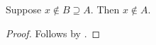 

\begin{composition}\label{independent_negative_right}
    Suppose $x\notin B\supseteq A$.
    Then $x\notin A$.
\end{composition}
\begin{proof}
    Follows by .
\end{proof}
